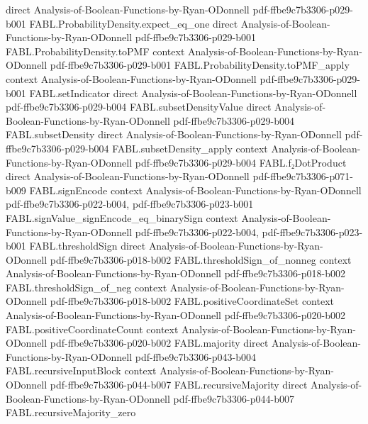\begin{theorem}
  {direct}
  {Analysis-of-Boolean-Functions-by-Ryan-ODonnell}
  {pdf-ffbe9c7b3306-p029-b001}
\proofstep
  {FABL.ProbabilityDensity.expect_eq_one}
  {direct}
  {Analysis-of-Boolean-Functions-by-Ryan-ODonnell}
  {pdf-ffbe9c7b3306-p029-b001}
\proofstep
  {FABL.ProbabilityDensity.toPMF}
  {context}
  {Analysis-of-Boolean-Functions-by-Ryan-ODonnell}
  {pdf-ffbe9c7b3306-p029-b001}
\proofstep
  {FABL.ProbabilityDensity.toPMF_apply}
  {context}
  {Analysis-of-Boolean-Functions-by-Ryan-ODonnell}
  {pdf-ffbe9c7b3306-p029-b001}
\proofstep
  {FABL.setIndicator}
  {direct}
  {Analysis-of-Boolean-Functions-by-Ryan-ODonnell}
  {pdf-ffbe9c7b3306-p029-b004}
\proofstep
  {FABL.subsetDensityValue}
  {direct}
  {Analysis-of-Boolean-Functions-by-Ryan-ODonnell}
  {pdf-ffbe9c7b3306-p029-b004}
\proofstep
  {FABL.subsetDensity}
  {direct}
  {Analysis-of-Boolean-Functions-by-Ryan-ODonnell}
  {pdf-ffbe9c7b3306-p029-b004}
\proofstep
  {FABL.subsetDensity_apply}
  {context}
  {Analysis-of-Boolean-Functions-by-Ryan-ODonnell}
  {pdf-ffbe9c7b3306-p029-b004}
\proofstep
  {FABL.f₂DotProduct}
  {direct}
  {Analysis-of-Boolean-Functions-by-Ryan-ODonnell}
  {pdf-ffbe9c7b3306-p071-b009}
\proofstep
  {FABL.signEncode}
  {context}
  {Analysis-of-Boolean-Functions-by-Ryan-ODonnell}
  {pdf-ffbe9c7b3306-p022-b004,
    pdf-ffbe9c7b3306-p023-b001}
\proofstep
  {FABL.signValue_signEncode_eq_binarySign}
  {context}
  {Analysis-of-Boolean-Functions-by-Ryan-ODonnell}
  {pdf-ffbe9c7b3306-p022-b004,
    pdf-ffbe9c7b3306-p023-b001}
\proofstep
  {FABL.thresholdSign}
  {direct}
  {Analysis-of-Boolean-Functions-by-Ryan-ODonnell}
  {pdf-ffbe9c7b3306-p018-b002}
\proofstep
  {FABL.thresholdSign_of_nonneg}
  {context}
  {Analysis-of-Boolean-Functions-by-Ryan-ODonnell}
  {pdf-ffbe9c7b3306-p018-b002}
\proofstep
  {FABL.thresholdSign_of_neg}
  {context}
  {Analysis-of-Boolean-Functions-by-Ryan-ODonnell}
  {pdf-ffbe9c7b3306-p018-b002}
\proofstep
  {FABL.positiveCoordinateSet}
  {context}
  {Analysis-of-Boolean-Functions-by-Ryan-ODonnell}
  {pdf-ffbe9c7b3306-p020-b002}
\proofstep
  {FABL.positiveCoordinateCount}
  {context}
  {Analysis-of-Boolean-Functions-by-Ryan-ODonnell}
  {pdf-ffbe9c7b3306-p020-b002}
\proofstep
  {FABL.majority}
  {direct}
  {Analysis-of-Boolean-Functions-by-Ryan-ODonnell}
  {pdf-ffbe9c7b3306-p043-b004}
\proofstep
  {FABL.recursiveInputBlock}
  {context}
  {Analysis-of-Boolean-Functions-by-Ryan-ODonnell}
  {pdf-ffbe9c7b3306-p044-b007}
\proofstep
  {FABL.recursiveMajority}
  {direct}
  {Analysis-of-Boolean-Functions-by-Ryan-ODonnell}
  {pdf-ffbe9c7b3306-p044-b007}
\proofstep
  {FABL.recursiveMajority_zero}

\end{theorem}
